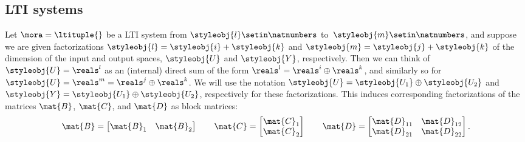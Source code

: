 \subsection{LTI systems}

Let $\mora = \ltituple{}$ be a LTI system from $\styleobj{l}\setin \natnumbers$ to~$\styleobj{m}\setin \natnumbers$, and suppose we are given factorizations $\styleobj{l} = \styleobj{i} + \styleobj{k}$ and $\styleobj{m} = \styleobj{j} + \styleobj{k}$ of the dimension of the input and output spaces, $\styleobj{U}$ and $\styleobj{Y}$, respectively.
Then we can think of $\styleobj{U} = \reals^l$ as an (internal) direct sum of the form $\reals^l = \reals^i \oplus \reals^k$, and similarly so for $\styleobj{U} = \reals^m = \reals^j \oplus \reals^k$.
We will use the notation $\styleobj{U} = \styleobj{U_1} \oplus \styleobj{U_2}$ and $\styleobj{Y} = \styleobj{U_1} \oplus \styleobj{U_2}$, respectively for these factorizations.
This induces corresponding factorizations of the matrices $\mat{B}$, $\mat{C}$, and $\mat{D}$ as block matrices:
\begin{equation}
    \mat{B} =
    \begin{bmatrix}
        \mat{B}_1 & \mat{B}_2
    \end{bmatrix}
    \qquad
    \mat{C} =
    \begin{bmatrix}
        \mat{C}_1 \\
        \mat{C}_2
    \end{bmatrix}
    \qquad
    \mat{D} =
    \begin{bmatrix}
        \mat{D}_{11} & \mat{D}_{12} \\
        \mat{D}_{21} & \mat{D}_{22}
    \end{bmatrix}.
\end{equation}

